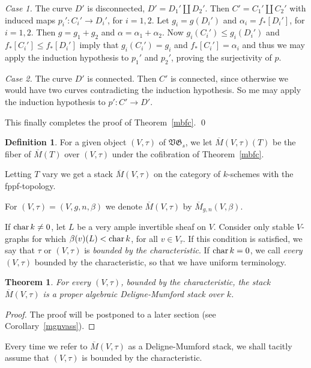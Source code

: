 \documentclass[11pt]{amsart}
\newtheorem{them}[prop]{Theorem}
\theoremstyle{definition}
\newtheorem{defn}[prop]{Definition}
\theoremstyle{remark}
\newenvironment{pf}{\begin{proof}}{\end{proof}}
\newcommand{\lst}{_{\ast}}
\newcommand{\GG}{{\mathfrak{G}}}
\newcommand{\VV}{{\mathfrak{V}}}
\newcommand{\chr}{\operatorname{\rm char}\nolimits}
\newcommand{\ol}{\overline}
\renewcommand{\t}{_{\tau}}
\theoremstyle{plain}
\theoremstyle{definition}
\theoremstyle{remark}
\begin{document}
{\em Case 1. } The curve \(D'\) is disconnected, \(D'=D_1'\amalg D_2'\). Then
\(C'=C_1'\amalg C_2'\) with induced maps
\(p_i':C_i'\rightarrow D_i'\), for \(i=1,2\). Let \(g_i=g(D_i')\) and
\(\alpha_i=f\lst[D_i']\), for \(i=1,2\). Then \(g=g_1+g_2\)
and \(\alpha=\alpha_1+\alpha_2\). Now \(g_i(C_i')\leq g_i(D_i')\) and
\(f\lst[C_i']\leq f\lst[D_i']\) imply that
\(g_i(C_i')=g_i\) and \(f\lst[C_i']=\alpha_i\) and thus we may apply the induction
hypothesis to \(p_1'\) and \(p_2'\), proving
the surjectivity of \(p\).

{\em Case 2. } The curve \(D'\) is connected. Then \(C'\) is connected, since
otherwise we would have two
curves contradicting the induction hypothesis. So me may apply the induction
hypothesis to \(p':C'\rightarrow D'\).

This finally completes the proof of Theorem~\ref{mbfc}. \qed

\begin{defn} \label{doosf}
For a given object \((V,\tau)\) of \(\VV\GG_s\), we let \(\ol{M}(V,\tau)(T)\) be the
fiber of \(\ol{M}(T)\) over
\((V,\tau)\) under the cofibration of Theorem~\ref{mbfc}.

Letting \(T\) vary we get a stack \(\ol{M}(V,\tau)\) on the category of
\(k\)-schemes with the fppf-topology.

For \((V,\tau)=(V,g,n,\beta)\) we denote \(\ol{M}(V,\tau)\) by
\(\ol{M}_{g,n}(V,\beta)\).
\end{defn}

If \(\chr k\not=0\), let \(L\) be a very ample invertible sheaf on \(V\). Consider
only stable \(V\)-graphs for which
\(\beta(v)(L)<\chr k\), for all \(v\in V\t\). If this condition is satisfied, we
say that \(\tau\) or \((V,\tau)\) is {\em
bounded by the characteristic}. If \(\chr k=0\), we call {\em every }\((V,\tau)\)
bounded by the characteristic, so that we
have uniform terminology.

\begin{them} \label{mgnvas}
For every \((V,\tau)\), bounded by the characteristic, the stack \(\ol{M}(V,\tau)\)
is a proper algebraic
Deligne-Mumford stack over \(k\).
\end{them}
\begin{pf}
The proof will be postponed to a later section (see Corollary~\ref{mgnvass}).
\end{pf}

Every time we refer to \(\ol{M}(V,\tau)\) as a Deligne-Mumford stack, we shall
tacitly assume that \((V,\tau)\) is bounded
by the characteristic.
\end{document}
